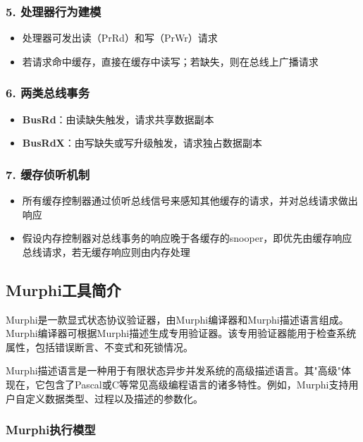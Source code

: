 \documentclass[a4paper]{article}
\begin{document}
\subsubsection{5. 处理器行为建模}
\begin{itemize}
    \item 处理器可发出读（PrRd）和写（PrWr）请求
    \item 若请求命中缓存，直接在缓存中读写；若缺失，则在总线上广播请求
\end{itemize}

\subsubsection{6. 两类总线事务}
\begin{itemize}
    \item \textbf{BusRd}：由读缺失触发，请求共享数据副本
    \item \textbf{BusRdX}：由写缺失或写升级触发，请求独占数据副本
\end{itemize}

\subsubsection{7. 缓存侦听机制}
\begin{itemize}
    \item 所有缓存控制器通过侦听总线信号来感知其他缓存的请求，并对总线请求做出响应
    \item 假设内存控制器对总线事务的响应晚于各缓存的snooper，即优先由缓存响应总线请求，若无缓存响应则由内存处理
\end{itemize}

\subsection{Murphi工具简介}

Murphi是一款显式状态协议验证器，由Murphi编译器和Murphi描述语言组成。Murphi编译器可根据Murphi描述生成专用验证器。该专用验证器能用于检查系统属性，包括错误断言、不变式和死锁情况。

Murphi描述语言是一种用于有限状态异步并发系统的高级描述语言。其"高级"体现在，它包含了Pascal或C等常见高级编程语言的诸多特性。例如，Murphi支持用户自定义数据类型、过程以及描述的参数化。

\subsubsection{Murphi执行模型}
\end{document}
